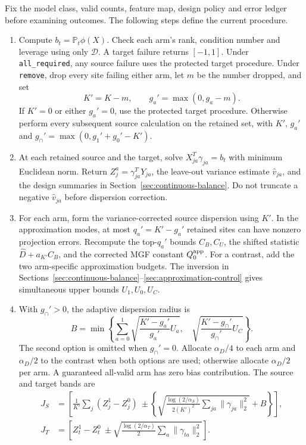 Fix the model class, valid counts, feature map, design policy and error ledger
before examining outcomes. The following steps define the current procedure.
\begin{enumerate}
\item Compute $b_t=\mathbb P_t\phi(X)$. Check each arm's rank, condition number
and leverage using only $\mathcal D$. A target failure returns $[-1,1]$.
Under \texttt{all\_required}, any source failure uses the protected target
procedure. Under \texttt{remove}, drop every site failing either arm, let
$m$ be the number dropped, and set
\[
 K'=K-m,\qquad g_a'=\max(0,g_a-m).
\]
If $K'=0$ or either $g_a'=0$, use the protected target procedure. Otherwise
perform every subsequent source calculation on the retained set, with $K'$,
$g_a'$ and $g_\cap'=\max(0,g_1'+g_0'-K')$.
\item At each retained source and the target, solve
$X_{ja}^T\gamma_{ja}=b_t$ with minimum Euclidean norm. Return
$Z_j^a=\gamma_{ja}^TY_{ja}$, the leave-out variance estimate
$\widehat v_{ja}$, and the design summaries in
Section~\ref{sec:continuous-balance}. Do not truncate a negative
$\widehat v_{ja}$ before dispersion correction.
\item For each arm, form the variance-corrected source dispersion using
$K'$. In the approximation modes, at most $q_a'=K'-g_a'$ retained sites can
have nonzero projection errors. Recompute the top-$q_a'$ bounds $C_B,C_U$,
the shifted statistic $\widehat D+a_{K'}C_B$, and the corrected MGF constant
$Q_0^{\rm app}$. For a contrast, add the two arm-specific approximation
budgets. The inversion in Sections~\ref{sec:continuous-balance}--\ref{sec:approximation-control}
gives simultaneous upper bounds $U_1,U_0,U_C$.
\item With $g_\cap'>0$, the adaptive dispersion radius is
\[
 B=\min\left\{
 \sum_{a=0}^1\sqrt{\frac{K'-g_a'}{g_a'}U_a},\quad
 \sqrt{\frac{K'-g_\cap'}{g_\cap'}U_C}\right\}.
\]
The second option is omitted when $g_\cap'=0$. Allocate $\alpha_D/4$ to
each arm and $\alpha_D/2$ to the contrast when both options are used;
otherwise allocate $\alpha_D/2$ per arm. A guaranteed all-valid arm has zero
bias contribution. The source and target bands are
\begin{align*}
 J_S&=\left[\frac1{K'}\sum_j(Z_j^1-Z_j^0)
       \ \pm\left\{\sqrt{\frac{\log(2/\alpha_S)}{2(K')^2}
                         \sum_{ja}\|\gamma_{ja}\|_2^2}+B\right\}\right],\\
 J_T&=\left[Z_t^1-Z_t^0\ \pm
          \sqrt{\frac{\log(2/\alpha_T)}2\sum_a\|\gamma_{ta}\|_2^2}\right].

\end{align*}
\end{enumerate}
